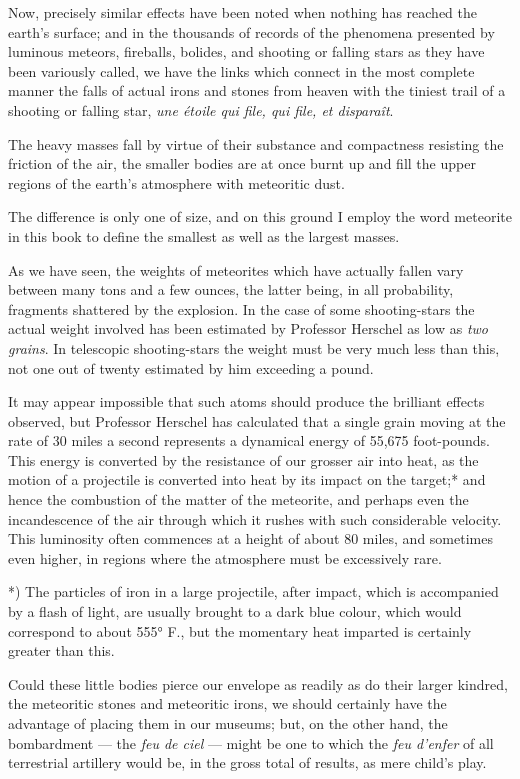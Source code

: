 \documentclass[a4paper, 12pt, oneside, polutonikogreek, english]{article}
\begin{document}
Now, precisely similar effects have been noted when nothing has reached the earth's surface; and in the thousands of records of the phenomena presented by luminous meteors, fireballs, bolides, and shooting or falling stars as they have been variously called, we have the links which connect in the most complete manner the falls of actual irons and stones from heaven with the tiniest trail of a shooting or falling star, \emph{une étoile qui file, qui file, et disparaît}.

The heavy masses fall by virtue of their substance and compactness resisting the friction of the air, the smaller bodies are at once burnt up and fill the upper regions of the earth's atmosphere with meteoritic dust.

The difference is only one of size, and on this ground I employ the word meteorite in this book to define the smallest as well as the largest masses.

As we have seen, the weights of meteorites which have actually fallen vary between many tons and a few ounces, the latter being, in all probability, fragments shattered by the explosion. In the case of some shooting-stars the actual weight involved has been estimated by Professor Herschel as low as \emph{two grains}. In telescopic shooting-stars the weight must be very much less than this, not one out of twenty estimated by him exceeding a pound.

It may appear impossible that such atoms should produce the brilliant effects observed, but Professor Herschel has calculated that a single grain moving at the rate of 30 miles a second represents a dynamical energy of 55,675 foot-pounds. This energy is converted by the resistance of our grosser air into heat, as the motion of a projectile is converted into heat by its impact on the target;* and hence the combustion of the matter of the meteorite, and perhaps even the incandescence of the air through which it rushes with such considerable velocity. This luminosity often commences at a height of about 80 miles, and sometimes even higher, in regions where the atmosphere must be excessively rare.

*) The particles of iron in a large projectile, after impact, which is accompanied by a flash of light, are usually brought to a dark blue colour, which would correspond to about 555° F., but the momentary heat imparted is certainly greater than this.

Could these little bodies pierce our envelope as readily as do their larger kindred, the meteoritic stones and meteoritic irons, we should certainly have the advantage of placing them in our museums; but, on the other hand, the bombardment --- the \emph{feu de ciel} --- might be one to which the \emph{feu d'enfer} of all terrestrial artillery would be, in the gross total of results, as mere child's play.
\end{document}
